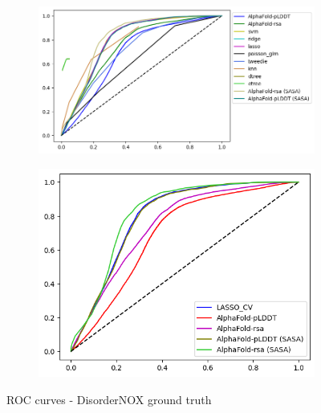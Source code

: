 \begin{figure}[h!]
    \begin{subfigure}{1.1\linewidth}
        \includegraphics[width=\linewidth]{res/ML/roc-disordernox-total.png}
    \end{subfigure}
    
    \begin{subfigure}{0.8\linewidth}
        \includegraphics[width=\linewidth]{res/ML/roc-disordernox.png}
    \end{subfigure}
    \caption{ROC curves - DisorderNOX ground truth}
\end{figure}

\pagebreak

